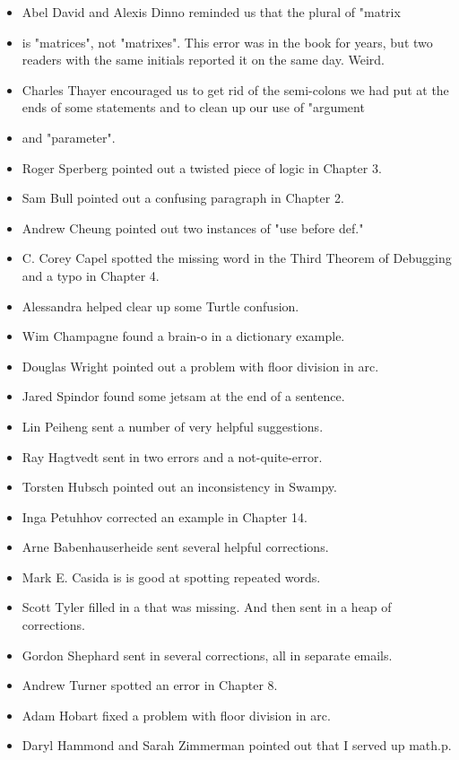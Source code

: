 \begin{itemize}
\item Abel David and Alexis Dinno reminded us that the plural of "matrix
\item is "matrices", not "matrixes". 
This error was in the book for years, but two readers with the same initials reported it 
on the same day. Weird. 
\item Charles Thayer encouraged us to get rid of the semi-colons we had put at the ends of some 
statements and to clean up our use of "argument
\item and "parameter". 
\item Roger Sperberg pointed out a twisted piece of logic in Chapter 3. 
\item Sam Bull pointed out a confusing paragraph in Chapter 2. 
\item Andrew Cheung pointed out two instances of "use before def."
\item C. Corey Capel spotted the missing word in the Third Theorem of Debugging and a typo in 
Chapter 4. 
\item Alessandra helped clear up some Turtle confusion. 
\item Wim Champagne found a brain-o in a dictionary example. 
\item Douglas Wright pointed out a problem with floor division in arc. 
\item Jared Spindor found some jetsam at the end of a sentence. 
\item Lin Peiheng sent a number of very helpful suggestions. 
\item Ray Hagtvedt sent in two errors and a not-quite-error. 
\item Torsten Hubsch pointed out an inconsistency in Swampy. 
\item Inga Petuhhov corrected an example in Chapter 14. 
\item Arne Babenhauserheide sent several helpful corrections. 
\item Mark E. Casida is is good at spotting repeated words. 
\item Scott Tyler filled in a that was missing. And then sent in a heap of corrections. 
\item Gordon Shephard sent in several corrections, all in separate emails. 
\item Andrew Turner spotted an error in Chapter 8. 
\item Adam Hobart fixed a problem with floor division in arc. 
\item Daryl Hammond and Sarah Zimmerman pointed out that I served up math.p. 

\end{itemize}
